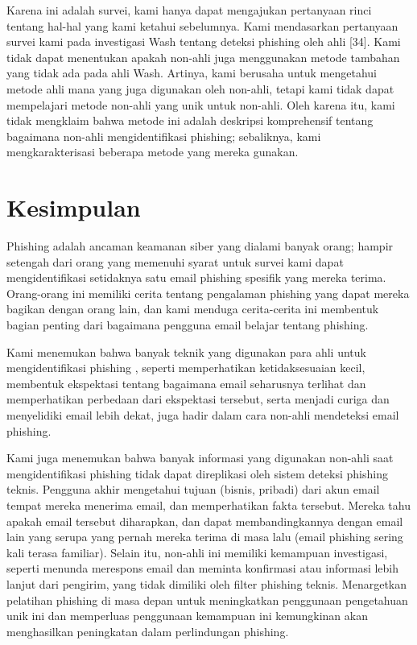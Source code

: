 \documentclass[lettersize,journal]{IEEEtran}
\begin{document}
Karena ini adalah survei, kami hanya dapat mengajukan pertanyaan rinci tentang
hal-hal yang kami ketahui sebelumnya. Kami mendasarkan pertanyaan survei kami
pada investigasi Wash tentang deteksi phishing oleh ahli [34]. Kami tidak dapat
menentukan apakah non-ahli juga menggunakan metode tambahan yang tidak ada pada
ahli Wash. Artinya, kami berusaha untuk mengetahui metode ahli mana yang juga
digunakan oleh non-ahli, tetapi kami tidak dapat mempelajari metode non-ahli
yang unik untuk non-ahli. Oleh karena itu, kami tidak mengklaim bahwa metode
ini adalah deskripsi komprehensif tentang bagaimana non-ahli mengidentifikasi
phishing; sebaliknya, kami mengkarakterisasi beberapa metode yang mereka
gunakan.

\section{Kesimpulan}
Phishing adalah ancaman keamanan siber yang dialami banyak orang; hampir
setengah dari orang yang memenuhi syarat untuk survei kami dapat
mengidentifikasi setidaknya satu email phishing spesifik yang mereka terima.
Orang-orang ini memiliki cerita tentang pengalaman phishing yang dapat mereka
bagikan dengan orang lain, dan kami menduga cerita-cerita ini membentuk bagian
penting dari bagaimana pengguna email belajar tentang phishing.

Kami menemukan bahwa banyak teknik yang digunakan para ahli untuk
mengidentifikasi phishing \cite{tigaempat}, seperti memperhatikan
ketidaksesuaian kecil, membentuk ekspektasi tentang bagaimana email seharusnya
terlihat dan memperhatikan perbedaan dari ekspektasi tersebut, serta menjadi
curiga dan menyelidiki email lebih dekat, juga hadir dalam cara non-ahli
mendeteksi email phishing.

Kami juga menemukan bahwa banyak informasi yang digunakan non-ahli saat
mengidentifikasi phishing tidak dapat direplikasi oleh sistem deteksi phishing
teknis. Pengguna akhir mengetahui tujuan (bisnis, pribadi) dari akun email
tempat mereka menerima email, dan memperhatikan fakta tersebut. Mereka tahu
apakah email tersebut diharapkan, dan dapat membandingkannya dengan email lain
yang serupa yang pernah mereka terima di masa lalu (email phishing sering kali
terasa familiar). Selain itu, non-ahli ini memiliki kemampuan investigasi,
seperti menunda merespons email dan meminta konfirmasi atau informasi lebih
lanjut dari pengirim, yang tidak dimiliki oleh filter phishing teknis.
Menargetkan pelatihan phishing di masa depan untuk meningkatkan penggunaan
pengetahuan unik ini dan memperluas penggunaan kemampuan ini kemungkinan akan
menghasilkan peningkatan dalam perlindungan phishing.
\end{document}
